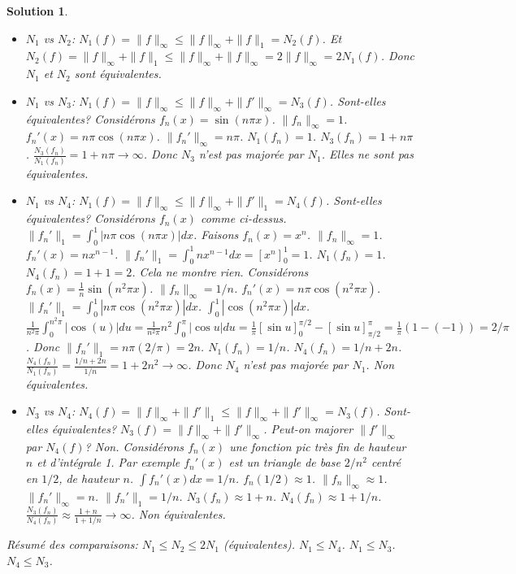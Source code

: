 \documentclass{article}
\newtheorem{solution}{Solution}
\begin{document}
\begin{solution}
\begin{itemize}
    \item $N_1$ vs $N_2$: $N_1(f) = \|f\|_\infty \leq \|f\|_\infty + \|f\|_1 = N_2(f)$. Et $N_2(f) = \|f\|_\infty + \|f\|_1 \leq \|f\|_\infty + \|f\|_\infty = 2 \|f\|_\infty = 2 N_1(f)$. Donc $N_1$ et $N_2$ sont équivalentes.
    \item $N_1$ vs $N_3$: $N_1(f) = \|f\|_\infty \leq \|f\|_\infty + \|f'\|_\infty = N_3(f)$. Sont-elles équivalentes? Considérons $f_n(x) = \sin(n \pi x)$. $\|f_n\|_\infty = 1$. $f_n'(x) = n \pi \cos(n \pi x)$. $\|f_n'\|_\infty = n \pi$. $N_1(f_n)=1$. $N_3(f_n) = 1 + n\pi$. $\frac{N_3(f_n)}{N_1(f_n)} = 1+n\pi \to \infty$. Donc $N_3$ n'est pas majorée par $N_1$. Elles ne sont pas équivalentes.
    \item $N_1$ vs $N_4$: $N_1(f) = \|f\|_\infty \leq \|f\|_\infty + \|f'\|_1 = N_4(f)$. Sont-elles équivalentes? Considérons $f_n(x)$ comme ci-dessus. $\|f_n'\|_1 = \int_0^1 |n \pi \cos(n \pi x)| dx$. Faisons $f_n(x) = x^n$. $\|f_n\|_\infty = 1$. $f_n'(x) = nx^{n-1}$. $\|f_n'\|_1 = \int_0^1 nx^{n-1} dx = [x^n]_0^1 = 1$. $N_1(f_n)=1$. $N_4(f_n) = 1+1=2$. Cela ne montre rien. Considérons $f_n(x) = \frac{1}{n} \sin(n^2 \pi x)$. $\|f_n\|_\infty = 1/n$. $f_n'(x) = n \pi \cos(n^2 \pi x)$. $\|f_n'\|_1 = \int_0^1 |n \pi \cos(n^2 \pi x)| dx$. $\int_0^1 |\cos(n^2 \pi x)| dx$. $\frac{1}{n^2 \pi} \int_0^{n^2 \pi} |\cos(u)| du = \frac{1}{n^2 \pi} n^2 \int_0^\pi |\cos u| du = \frac{1}{\pi} [\sin u]_0^{\pi/2} - [\sin u]_{\pi/2}^\pi = \frac{1}{\pi}(1 - (-1)) = 2/\pi$. Donc $\|f_n'\|_1 = n\pi (2/\pi) = 2n$. $N_1(f_n) = 1/n$. $N_4(f_n) = 1/n + 2n$. $\frac{N_4(f_n)}{N_1(f_n)} = \frac{1/n+2n}{1/n} = 1 + 2n^2 \to \infty$. Donc $N_4$ n'est pas majorée par $N_1$. Non équivalentes.
    \item $N_3$ vs $N_4$: $N_4(f) = \|f\|_\infty + \|f'\|_1 \leq \|f\|_\infty + \|f'\|_\infty = N_3(f)$. Sont-elles équivalentes? $N_3(f) = \|f\|_\infty + \|f'\|_\infty$. Peut-on majorer $\|f'\|_\infty$ par $N_4(f)$? Non. Considérons $f_n(x)$ une fonction pic très fin de hauteur $n$ et d'intégrale 1. Par exemple $f_n'(x)$ est un triangle de base $2/n^2$ centré en $1/2$, de hauteur $n$. $\int f_n'(x) dx = 1/n$. $f_n(1/2) \approx 1$. $\|f_n\|_\infty \approx 1$. $\|f_n'\|_\infty = n$. $\|f_n'\|_1 = 1/n$. $N_3(f_n) \approx 1+n$. $N_4(f_n) \approx 1+1/n$. $\frac{N_3(f_n)}{N_4(f_n)} \approx \frac{1+n}{1+1/n} \to \infty$. Non équivalentes.
\end{itemize}

Résumé des comparaisons:
$N_1 \leq N_2 \leq 2 N_1$ (équivalentes).
$N_1 \leq N_4$.
$N_1 \leq N_3$.
$N_4 \leq N_3$.


\end{solution}
\end{document}
